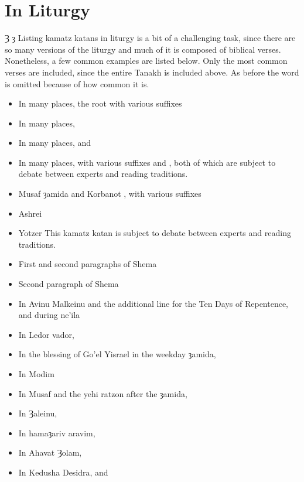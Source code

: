 \documentclass[14pt]{book}
\begin{document}
\chapter{In Liturgy}
Ȝ ȝ
Listing kamatz katans in liturgy is a bit of a challenging task, since there are so many versions of the liturgy and much of it is composed of biblical verses.  Nonetheless, a few common examples are listed below.  Only the most common verses are included, since the entire Tanakh is included above. As before the word  is omitted because of how common it is.
\begin{itemize}
		\item In many places, the root  with various suffixes
		\item In many places,   
		\item In many places,  and 
		\item In many places,  with various suffixes and , both of which are subject to debate between experts and reading traditions.
		\item Musaf ȝamida and Korbanot , with various suffixes
		\item Ashrei 
		\item Yotzer  This kamatz katan is subject to debate between experts and reading traditions.
		\item First and second paragraphs of Shema 
		\item Second paragraph of Shema 
		\item In Avinu Malkeinu and the additional line for the Ten Days of Repentence,   and during ne'ila 
		\item In Ledor vador, 
		\item In the blessing of Go'el Yisrael in the weekday ȝamida, 
		\item In Modim 
		\item In Musaf and the yehi ratzon after the ȝamida, 
		\item In Ȝaleinu, 
		\item In hamaȝariv aravim, 
		\item In Ahavat Ȝolam, 
		\item In Kedusha Desidra,  and 

\end{itemize}
\end{document}
